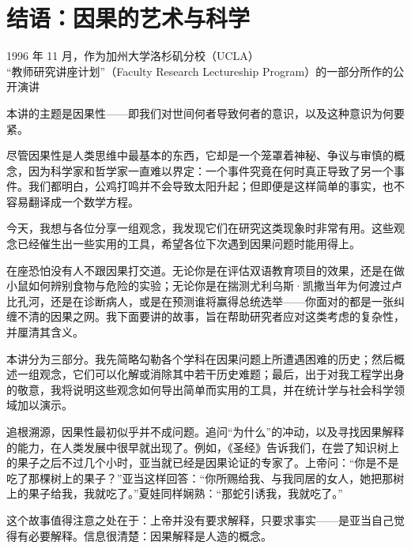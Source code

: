 \chapter*{结语：因果的艺术与科学}
\thispagestyle{plain}

\begin{center}
\kaishu\small
1996 年 11 月，作为加州大学洛杉矶分校（UCLA）\\
“教师研究讲座计划”（Faculty Research Lectureship Program）的一部分所作的公开演讲
\end{center}

\vspace{0.6em}

本讲的主题是因果性——即我们对世间何者导致何者的意识，以及这种意识为何要紧。

尽管因果性是人类思维中最基本的东西，它却是一个笼罩着神秘、争议与审慎的概念，因为科学家和哲学家一直难以界定：一个事件究竟在何时真正导致了另一个事件。我们都明白，公鸡打鸣并不会导致太阳升起；但即便是这样简单的事实，也不容易翻译成一个数学方程。

今天，我想与各位分享一组观念，我发现它们在研究这类现象时非常有用。这些观念已经催生出一些实用的工具，希望各位下次遇到因果问题时能用得上。

在座恐怕没有人不跟因果打交道。无论你是在评估双语教育项目的效果，还是在做小鼠如何辨别食物与危险的实验；无论你是在揣测尤利乌斯·凯撒当年为何渡过卢比孔河，还是在诊断病人，或是在预测谁将赢得总统选举——你面对的都是一张纠缠不清的因果之网。我下面要讲的故事，旨在帮助研究者应对这类考虑的复杂性，并厘清其含义。

本讲分为三部分。我先简略勾勒各个学科在因果问题上所遭遇困难的历史；然后概述一组观念，它们可以化解或消除其中若干历史难题；最后，出于对我工程学出身的敬意，我将说明这些观念如何导出简单而实用的工具，并在统计学与社会科学领域加以演示。

追根溯源，因果性最初似乎并不成问题。追问“为什么”的冲动，以及寻找因果解释的能力，在人类发展中很早就出现了。例如，《圣经》告诉我们，在尝了知识树上的果子之后不过几个小时，亚当就已经是因果论证的专家了。上帝问：“你是不是吃了那棵树上的果子？”亚当这样回答：“你所赐给我、与我同居的女人，她把那树上的果子给我，我就吃了。”夏娃同样娴熟：“那蛇引诱我，我就吃了。”

这个故事值得注意之处在于：上帝并没有要求解释，只要求事实——是亚当自己觉得有必要解释。信息很清楚：因果解释是人造的概念。

